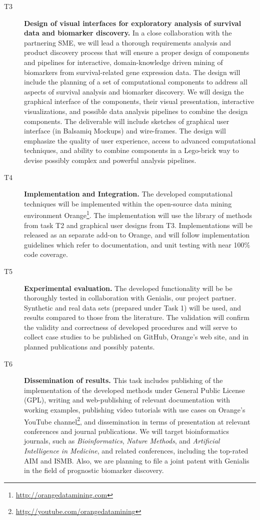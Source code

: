 \documentclass[11pt,a4paper]{article}
\newcommand{\myurl}[1]{\footnote{\url{#1}}}
\renewcommand{\bold}{\textbf}
\begin{document}
\begin{description}
	\item[T3] \bold{Design of visual interfaces for exploratory analysis of survival data and biomarker discovery.} In a close collaboration with the partnering SME, we will lead a thorough requirements analysis and product discovery process that will ensure a proper design of components and pipelines for interactive, domain-knowledge driven mining of biomarkers from survival-related gene expression data. The design will include the planning of a set of computational components to address all aspects of survival analysis and biomarker discovery. We will design the graphical interface of the components, their visual presentation, interactive visualizations, and possible data analysis pipelines to combine the design components. The deliverable will include sketches of graphical user interface (in Balsamiq Mockups) and wire-frames. The design will emphasize the quality of user experience, access to advanced computational techniques, and ability to combine components in a Lego-brick way to devise possibly complex and powerful analysis pipelines.
 	\item[T4] \bold{Implementation and Integration.} The developed computational techniques will be implemented within the open-source data mining environment Orange\myurl{http://orangedatamining.com}. The implementation will use the library of methods from task T2 and graphical user designs from T3. Implementations will be released as an separate add-on to Orange, and will follow implementation guidelines which refer to documentation, and unit testing with near 100\% code coverage.
 	\item[T5] \bold{Experimental evaluation.} The developed functionality will be be thoroughly tested in collaboration with Genialis, our project partner. Synthetic and real data sets (prepared under Task 1) will be used, and results compared to those from the literature. The validation will confirm the validity and correctness of developed procedures and will serve to collect case studies to be published on GitHub, Orange's web site, and in planned publications and possibly patents.
 	\item[T6] \bold{Dissemination of results.} This task includes publishing of the implementation of the developed methods under General Public License (GPL), writing and web-publishing of relevant documentation with working examples, publishing video tutorials with use cases on Orange's YouTube channel\myurl{http://youtube.com/orangedatamining}, and dissemination in terms of presentation at relevant conferences and journal publications. We will target bioinformatics journals, such as {\em Bioinformatics}, {\em Nature Methods}, and {\em Artificial Intelligence in Medicine}, and related conferences, including the top-rated AIM and ISMB. Also, we are planning to file a joint patent with Genialis in the field of prognostic biomarker discovery.
\end{description}
\end{document}
